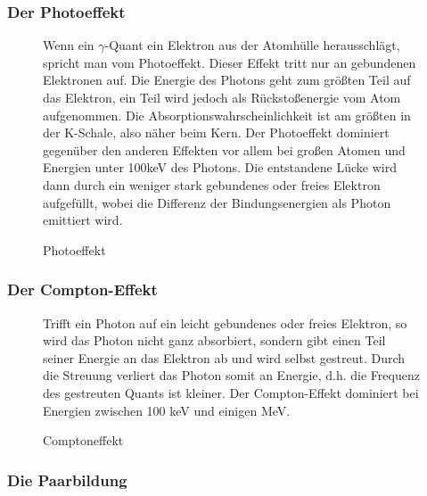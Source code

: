 \subsubsection{Der Photoeffekt}

\begin{figure}[H]
	\begin{minipage}{0.59\textwidth}
	\centering%
	\caption{Photoeffekt}
	\end{minipage}
	\begin{minipage}{0.4\textwidth}
	Wenn ein $\gamma$-Quant ein Elektron aus der Atomhülle herausschlägt, spricht man vom Photoeffekt. Dieser Effekt tritt nur an gebundenen Elek\-tro\-nen auf. Die Energie des Photons geht zum größten Teil auf das Elektron, ein Teil wird jedoch als Rückstoßenergie vom Atom aufgenommen. Die Ab\-sorp\-tions\-wahrscheinlichkeit ist am größten in der K-Schale, also näher beim Kern. Der Photoeffekt dominiert gegenüber den anderen Effekten vor allem bei großen Atomen und Energien unter 100keV des Photons. Die entstandene Lücke wird dann durch ein weniger stark gebundenes oder freies Elektron aufgefüllt, wobei die Differenz der Bindungsenergien als Photon emittiert wird.
	\end{minipage}
\end{figure}

\subsubsection{Der Compton-Effekt}

\begin{figure}[H]
	\begin{minipage}{0.4\textwidth}
	Trifft ein Photon auf ein leicht gebundenes oder freies Elektron, so wird das Photon nicht ganz absorbiert, sondern gibt einen Teil seiner Energie an das Elektron ab und wird selbst gestreut. Durch die Streuung verliert das Photon somit an Energie, d.h. die Frequenz des gestreuten Quants ist kleiner. Der Compton-Effekt dominiert bei Energien zwischen 100 keV und einigen MeV.
	\end{minipage}
	\begin{minipage}{0.59\textwidth}
	\centering %
	\caption{Comptoneffekt}
	\end{minipage}

\end{figure}

\subsubsection{Die Paarbildung}

